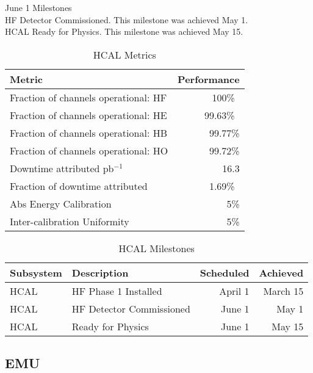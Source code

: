 \noindent June 1 Milestones \\
HF Detector Commissioned. This milestone was achieved May 1. \\
HCAL Ready for Physics. This milestone was achieved May 15.



\vskip 0.2in


\begin{table}[htp]
\caption{HCAL Metrics}
\begin{center}
\begin{tabular}{|l|r|}
\hline
Metric&Performance\\
\hline
Fraction of channels operational: HF& 100\%\ \\
\hline
Fraction of channels operational: HE& 99.63\%\ \\
\hline
Fraction of channels operational: HB& 99.77\% \\
\hline
Fraction of channels operational: HO& 99.72\%  \\
\hline
Downtime attributed pb$^{-1}$ & 16.3 \\
Fraction of downtime attributed& 1.69\%\ \\
\hline
Abs Energy Calibration & 5\% \\
\hline
Inter-calibration Uniformity & 5\% \\
\hline
\end{tabular}
\end{center}
\label{HCALMetrics}
\end{table}%


\begin{table}[htp]
\caption{HCAL Milestones}
\begin{center}
\begin{tabular}{|l|l|r|r|}
\hline
Subsystem&Description&Scheduled&Achieved\\
\hline
HCAL& HF Phase 1 Installed & April 1 &  March 15 \\
\hline
HCAL& HF Detector Commissioned & June 1 & May 1\\
\hline
HCAL& Ready for Physics & June 1 & May 15\\
\hline
\end{tabular}
\end{center}
\label{HCALMilestones}
\end{table}%








\subsection{EMU }


